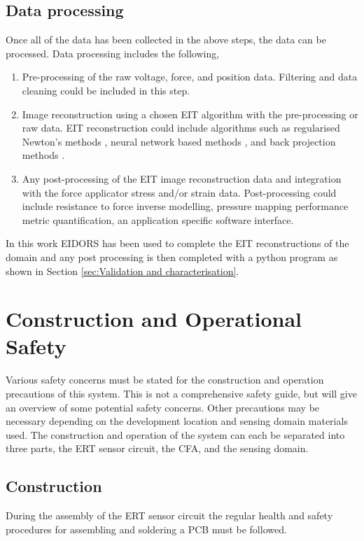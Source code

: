 \subsection{Data processing}
Once all of the data has been collected in the above steps, the data can be processed. Data processing includes the following,
\begin{enumerate}
	\item Pre-processing of the raw voltage, force, and position data. Filtering and data cleaning could be included in this step.
	\item Image reconstruction using a chosen EIT algorithm with the pre-processing or raw data. EIT reconstruction could include algorithms such as regularised Newton's methods \cite{Lionheart2003}, neural network based methods \cite{Biasi2022, Husain2021}, and back projection methods \cite{Avis1992}.
	\item Any post-processing of the EIT image reconstruction data and integration with the force applicator stress and/or strain data. Post-processing could include resistance to force inverse modelling, pressure mapping performance metric quantification, an application specific software interface.
\end{enumerate}
In this work EIDORS \cite{Sherry2006} has been used to complete the EIT reconstructions of the domain and any post processing is then completed with a python program as shown in Section \ref{sec:Validation and characterisation}.


\section{Construction and Operational Safety}
Various safety concerns must be stated for the construction and operation precautions of this system. This is not a comprehensive safety guide, but will give an overview of some potential safety concerns. Other precautions may be necessary depending on the development location and sensing domain materials used. The construction and operation of the system can each be separated into three parts, the ERT sensor circuit, the CFA, and the sensing domain.


\subsection{Construction}
During the assembly of the ERT sensor circuit the regular health and safety procedures for assembling and soldering a PCB must be followed.

